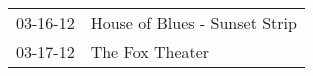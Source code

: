 \begin{supertabular}{p{0.07\textwidth}p{0.23\textwidth}}
 03-16-12 &  House of Blues - Sunset Strip \\
 03-17-12 &                The Fox Theater \\
\end{supertabular}
